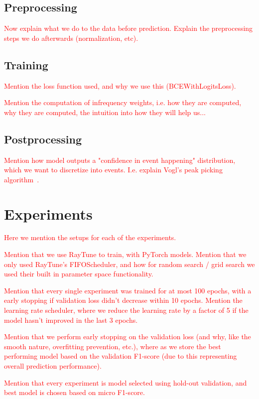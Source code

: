 \subsection{Preprocessing}

\textcolor{red}{Now explain what we do to the data before prediction. Explain the preprocessing steps we do afterwards (normalization, etc).}

\subsection{Training}

\textcolor{red}{Mention the loss function used, and why we use this (BCEWithLogitsLoss).}

\textcolor{red}{Mention the computation of infrequency weights, i.e. how they are computed, why they are computed, the intuition into how they will help us...}

\subsection{Postprocessing}

\textcolor{red}{Mention how model outputs a "confidence in event happening" distribution, which we want to discretize into events.
I.e. explain Vogl's peak picking algorithm~\cite{vogl2018multiinstrumentdrumtranscription}.}

\section{Experiments}

\textcolor{red}{Here we mention the setups for each of the experiments.}

\textcolor{red}{Mention that we use RayTune to train, with PyTorch models. Mention that we only used RayTune's FIFOScheduler, and how for random search / grid search we used their built in parameter space functionality.}

\textcolor{red}{Mention that every single experiment was trained for at most 100 epochs, with a early stopping if validation loss didn't decrease within 10 epochs.
Mention the learning rate scheduler, where we reduce the learning rate by a factor of 5 if the model hasn't improved in the last 3 epochs.}

\textcolor{red}{Mention that we perform early stopping on the validation loss (and why, like the smooth nature, overfitting prevention, etc.), where as we store the best performing model based on the validation F1-score (due to this representing overall prediction performance).}

\textcolor{red}{Mention that every experiment is model selected using hold-out validation, and best model is chosen based on micro F1-score.}